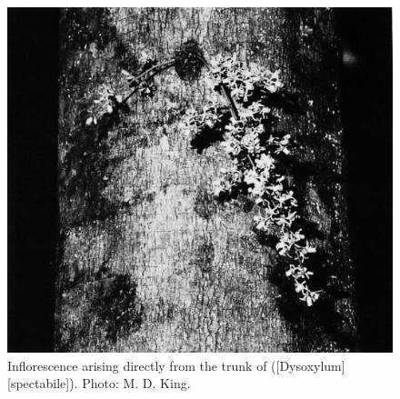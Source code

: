 \begin{figure}[t]
	\begin{minipage}[t]{\textwidth}
		\begin{minipage}[t]{(\textwidth-\fgap) * \real{0.622}}
			\centering
			\includegraphics[width=\textwidth]{graphics/figure16infloresence.jpg}
			\caption[Inflorescence arising directly from the trunk of kohekohe]{Inflorescence arising directly from the trunk of  ([Dysoxylum][spectabile]).
			Photo:  M. D. King.}%
			\label{fig:16infloresence}
		\end{minipage}\hspace{\fgap}%
		\begin{minipage}[t]{(\textwidth-\fgap) * \real{0.378}}
			\centering

\end{minipage}
\end{minipage}
\end{figure}
